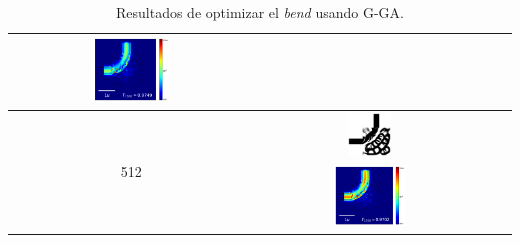 \begin{table}[ht]
\begin{tabular}{|c|c|c|c|}
      \includegraphics[width=0.33\textwidth]{image/results/bend/GA/visualize_field_cont_256.png} \\
    \hline
      \multirow{2}{*}{512} &
      \includegraphics[width=0.20\textwidth]{image/results/bend/GA/visualize_eps_cont_512.png} \\
      \cline{2-4}
      &
      \includegraphics[width=0.33\textwidth]{image/results/bend/GA/visualize_field_cont_512.png} \\
    \hline
    \end{tabular}
    \hspace*{-3cm}
    \caption{Resultados de optimizar el \emph{bend} usando G-GA.}
    \label{tab:opt-GA-bend}
\end{table}


